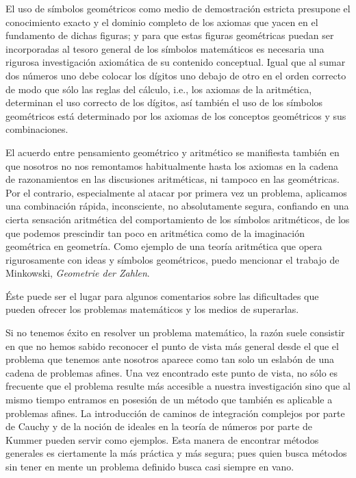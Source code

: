 \documentclass[a4paper, 12pt]{article}
\begin{document}
El uso de símbolos geométricos como medio de demostración estricta presupone el conocimiento exacto y el dominio completo de los axiomas que yacen en el fundamento de dichas figuras; y para que estas figuras geométricas puedan ser incorporadas al tesoro general de los símbolos matemáticos es necesaria una rigurosa investigación axiomática de su contenido conceptual. Igual que al sumar dos números uno debe colocar los dígitos uno debajo de otro en el orden correcto de modo que sólo las reglas del cálculo, i.e., los axiomas de la aritmética, determinan el uso correcto de los dígitos, así también el uso de los símbolos geométricos está determinado por los axiomas de los conceptos geométricos y sus combinaciones.


 El acuerdo entre pensamiento geométrico y aritmético se manifiesta también en que nosotros no nos remontamos habitualmente hasta los axiomas en la cadena de razonamientos en las discusiones aritméticas, ni tampoco en las geométricas. Por el contrario, especialmente al atacar por primera vez un problema, aplicamos una combinación rápida, inconsciente, no absolutamente segura, confiando en una cierta sensación aritmética del comportamiento de los símbolos aritméticos, de los que podemos prescindir tan poco en aritmética como de la imaginación geométrica en geometría. Como ejemplo de una teoría aritmética que opera rigurosamente con ideas y símbolos geométricos, puedo mencionar el trabajo de Minkowski,  \textit{Geometrie der Zahlen}.
 
Éste puede ser el lugar para algunos comentarios sobre las dificultades que pueden ofrecer los problemas matemáticos y los medios de superarlas. 

Si no tenemos éxito en resolver un problema matemático, la razón suele consistir en que no hemos sabido reconocer el punto de vista más general desde el que el problema que tenemos ante nosotros aparece como tan solo un eslabón de una cadena de problemas afines. Una vez encontrado este punto de vista, no sólo es frecuente que el problema resulte más accesible a nuestra investigación sino que al mismo tiempo entramos en posesión de un método que también es aplicable a problemas afines. La introducción de caminos de integración complejos por parte de Cauchy y de la noción de ideales en la teoría de números por parte de Kummer pueden servir como ejemplos. Esta manera de encontrar métodos generales es ciertamente la más práctica y más segura; pues quien busca métodos sin tener en mente un problema definido busca casi siempre en vano. 
\end{document}
